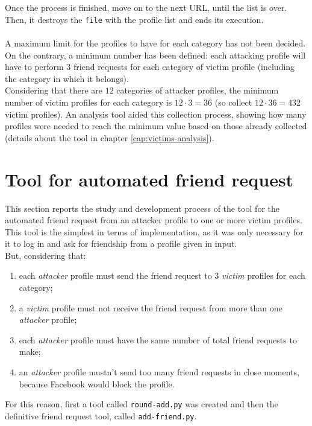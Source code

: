 \\\\Once the process is finished, move on to the next URL, until the list is over. Then, it destroys the \texttt{file} with the profile list and ends its execution.
\\\\A maximum limit for the profiles to have for each category has not been decided.\\On the contrary, a minimum number has been defined: each attacking profile will have to perform 3 friend requests for each category of victim profile (including the category in which it belongs). 
\\Considering that there are $12$ categories of attacker profiles, the minimum number of victim profiles for each category is $12 \cdot 3 = 36$ (so collect $12 \cdot 36 = 432$ victim profiles). An analysis tool aided this collection process, showing how many profiles were needed to reach the minimum value based on those already collected (details about the tool in chapter \ref{cap:victims-analysis}). 

\newpage
\section{Tool for automated friend request}
\label{cap:tool-friend-request}
This section reports the study and development process of the tool for the automated friend request from an attacker profile to one or more victim profiles.\\
This tool is the simplest in terms of implementation, as it was only necessary for it to log in and ask for friendship from a profile given in input. \\ 
But, considering that:
\begin{enumerate}
	\item each \textit{attacker} profile must send the friend request to 3 \textit{victim} profiles for each category;
	\item a \textit{victim} profile must not receive the friend request from more than one \textit{attacker} profile;
	\item each \textit{attacker} profile must have the same number of total friend requests to make;
	\item an \textit{attacker} profile mustn't send too many friend requests in close moments, because Facebook would block the profile.
\end{enumerate}
For this reason, first a tool called \texttt{round-add.py} was created and then the definitive friend request tool, called \texttt{add-friend.py}. 

